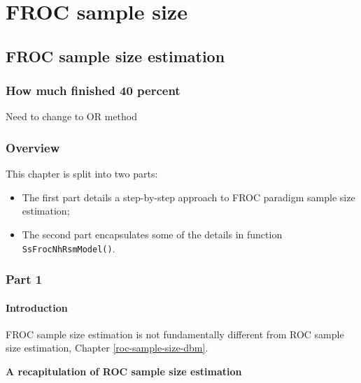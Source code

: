 \documentclass[
]{book}
\begin{document}
\hypertarget{part-froc-sample-size}{%
\part*{FROC sample size}\label{part-froc-sample-size}}

\hypertarget{froc-sample-size}{%
\chapter{FROC sample size estimation}\label{froc-sample-size}}

\hypertarget{froc-sample-size-how-much-finished}{%
\section{How much finished 40 percent}\label{froc-sample-size-how-much-finished}}

Need to change to OR method

\hypertarget{overview}{%
\section{Overview}\label{overview}}

This chapter is split into two parts:

\begin{itemize}
\item
  The first part details a step-by-step approach to FROC paradigm sample size estimation;
\item
  The second part encapsulates some of the details in function \texttt{SsFrocNhRsmModel()}.
\end{itemize}

\hypertarget{part-1}{%
\section{Part 1}\label{part-1}}

\hypertarget{froc-sample-size-intro}{%
\subsection{Introduction}\label{froc-sample-size-intro}}

FROC sample size estimation is not fundamentally different from ROC sample size estimation, Chapter \ref{roc-sample-size-dbm}.

\textbf{A recapitulation of ROC sample size estimation}
\end{document}
